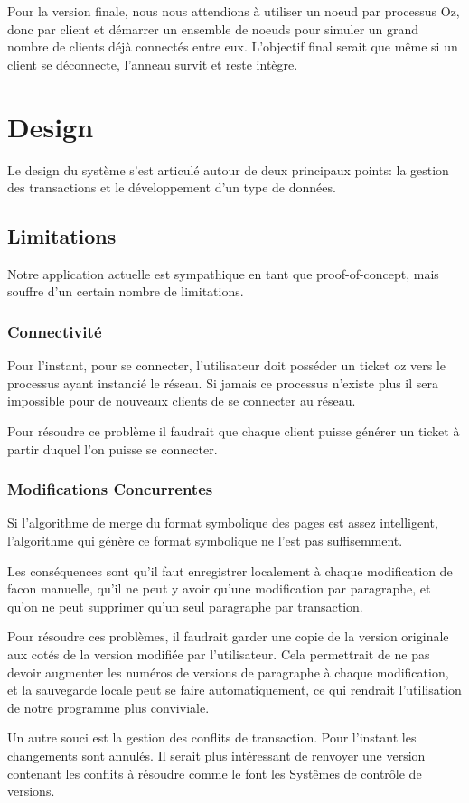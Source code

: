 \documentclass{article}
\begin{document}
	Pour la version finale, nous nous attendions à utiliser un noeud par processus Oz, donc par client et démarrer
	un ensemble de noeuds pour simuler un grand nombre de clients déjà connectés entre eux.  L'objectif final
	serait que même si un client se déconnecte, l'anneau survit et reste intègre.
	
	
	\section{Design}
	Le design du système s'est articulé autour de deux principaux points: la gestion des transactions et le développement
	d'un type de données.
	
	
	\subsection{Limitations}
	Notre application actuelle est sympathique en tant que proof-of-concept,
	mais souffre d'un certain nombre de limitations.
	\subsubsection{Connectivité} 
		Pour l'instant, pour se connecter, l'utilisateur doit posséder
		un ticket oz vers le processus ayant instancié le réseau.
		Si jamais ce processus n'existe plus il sera impossible pour de
		nouveaux clients de se connecter au réseau. 
		
		Pour résoudre ce problème il faudrait que chaque client puisse
		générer un ticket à partir duquel l'on puisse se connecter.
		
	 \subsubsection{Modifications Concurrentes}
	 	Si l'algorithme de merge du format symbolique des pages est
	 	assez intelligent, l'algorithme qui génère ce format symbolique
	 	ne l'est pas suffisemment. 
	 	
	 	Les conséquences sont qu'il faut enregistrer localement à 
	 	chaque modification de facon manuelle, qu'il ne peut y avoir qu'une modification par
	 	paragraphe, et qu'on ne peut supprimer qu'un seul paragraphe par
	 	transaction. 
	 	
	 	Pour résoudre ces problèmes, il faudrait garder une copie de
	 	la version originale aux cotés de la version modifiée par l'utilisateur.
	 	Cela permettrait de ne pas devoir augmenter les numéros de versions
	 	de paragraphe à chaque modification, et la sauvegarde locale peut
	 	se faire automatiquement, ce qui rendrait l'utilisation de notre
	 	programme plus conviviale. 
	 	
	 	Un autre souci est la gestion des conflits de transaction.
	 	Pour l'instant les changements sont annulés. Il serait plus
	 	intéressant de renvoyer une version contenant les conflits à résoudre
	 	comme le font les Systêmes de contrôle de versions.
\end{document}
